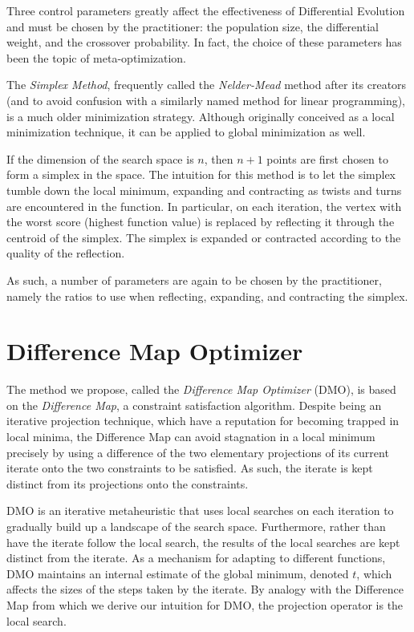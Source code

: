 \documentclass[12pt]{article}
\begin{document}
    Three control parameters greatly affect the effectiveness of Differential
    Evolution and must be chosen by the practitioner\cite{storn1997}: the
    population size, the differential weight, and the crossover probability.
    In fact, the choice of these parameters has been the topic of
    meta-optimization\cite{pedersen2010}.

    The \emph{Simplex Method}\cite{nelder1965}, frequently called the
    \emph{Nelder-Mead} method after its creators (and to avoid confusion with a
    similarly named method for linear programming), is a much older
    minimization strategy. Although originally conceived as a local
    minimization technique, it can be applied to global minimization as well.

    If the dimension of the search space is $n$, then $n+1$ points are first
    chosen to form a simplex in the space. The intuition for this method is to
    let the simplex tumble down the local minimum, expanding and contracting as
    twists and turns are encountered in the function. In particular, on each
    iteration, the vertex with the worst score (highest function value) is
    replaced by reflecting it through the centroid of the simplex. The simplex
    is expanded or contracted according to the quality of the reflection.

    As such, a number of parameters are again to be chosen by the practitioner,
    namely the ratios to use when reflecting, expanding, and contracting the
    simplex.


\section{Difference Map Optimizer}
    The method we propose, called the \emph{Difference Map Optimizer} (DMO), is
    based on the \emph{Difference Map}\cite{elser2007}, a constraint
    satisfaction algorithm.
    Despite being an iterative projection technique, which have a reputation
    for becoming trapped in local minima, the Difference Map can avoid
    stagnation in a local minimum precisely by using a difference of the two
    elementary projections of its current iterate onto the two constraints to
    be satisfied. As such, the iterate is kept distinct from its projections
    onto the constraints.

    DMO is an iterative metaheuristic that uses local searches on each
    iteration to gradually build up a landscape of the search space.
    Furthermore, rather than have the iterate follow the local search, the
    results of the local searches are kept distinct from the iterate.
    As a mechanism for adapting to different functions, DMO maintains an
    internal estimate of the global minimum, denoted $t$, which affects the
    sizes of the steps taken by the iterate. By analogy with the Difference Map
    from which we derive our intuition for DMO, the projection operator is the
    local search.
\end{document}
